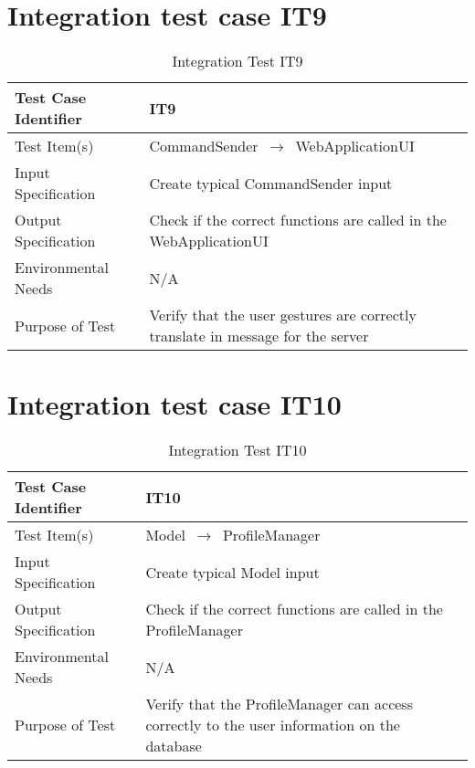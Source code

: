 \documentclass[../../testPlan.tex]{subfiles}
\begin{document}
	\section{Integration test case IT9}
		\begin{table}[H]
			\centering
			\label{IT9}
			\begin{tabular}{ll}
				\hline
				Test Case Identifier & IT9  \\ \hline
				Test Item(s)         & CommandSender $\,\to\,$ WebApplicationUI\\ \hline
				Input Specification  & Create typical CommandSender input  \\ \hline
				Output Specification & Check if the correct functions are called in the WebApplicationUI\\ \hline
				Environmental Needs  &  N/A \\ \hline
				Purpose of Test      &  Verify that the user gestures are correctly translate in message for the server  \\ \hline
			\end{tabular}
			\caption{Integration Test IT9}
		\end{table}
		
		
	\section{Integration test case IT10}
		\begin{table}[H]
			\centering
			\label{IT10}
			\begin{tabular}{ll}
				\hline
				Test Case Identifier & IT10  \\ \hline
				Test Item(s)         & Model $\,\to\,$ ProfileManager\\ \hline
				Input Specification  & Create typical Model input  \\ \hline
				Output Specification & Check if the correct functions are called in the ProfileManager\\ \hline
				Environmental Needs  &  N/A \\ \hline
				Purpose of Test      &  Verify that the ProfileManager can access correctly to the user information on the database \\ \hline
			\end{tabular}
			\caption{Integration Test IT10}
		\end{table}
		
		
\end{document}
